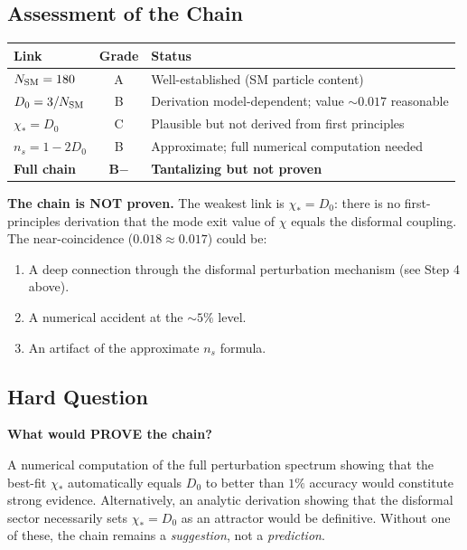 \documentclass[11pt,a4paper]{article}
\begin{document}
\subsection{Assessment of the Chain}

\begin{center}
\begin{tabular}{lcl}
\toprule
\textbf{Link} & \textbf{Grade} & \textbf{Status} \\
\midrule
$N_{\rm SM} = 180$ & A & Well-established (SM particle content) \\
$D_0 = 3/N_{\rm SM}$ & B & Derivation model-dependent; value $\sim 0.017$ reasonable \\
$\chi_* = D_0$ & C & Plausible but not derived from first principles \\
$n_s = 1 - 2D_0$ & B & Approximate; full numerical computation needed \\
\midrule
\textbf{Full chain} & \textbf{B$-$} & \textbf{Tantalizing but not proven} \\
\bottomrule
\end{tabular}
\end{center}

\textbf{The chain is NOT proven.} The weakest link is $\chi_* = D_0$: there is no first-principles derivation that the mode exit value of $\chi$ equals the disformal coupling. The near-coincidence ($0.018 \approx 0.017$) could be:
\begin{enumerate}
\item A deep connection through the disformal perturbation mechanism (see Step 4 above).
\item A numerical accident at the $\sim 5\%$ level.
\item An artifact of the approximate $n_s$ formula.
\end{enumerate}

\subsection{Hard Question}

\textbf{What would PROVE the chain?}

A numerical computation of the full perturbation spectrum showing that the best-fit $\chi_*$ automatically equals $D_0$ to better than $1\%$ accuracy would constitute strong evidence. Alternatively, an analytic derivation showing that the disformal sector necessarily sets $\chi_* = D_0$ as an attractor would be definitive. Without one of these, the chain remains a \emph{suggestion}, not a \emph{prediction}.
\end{document}
